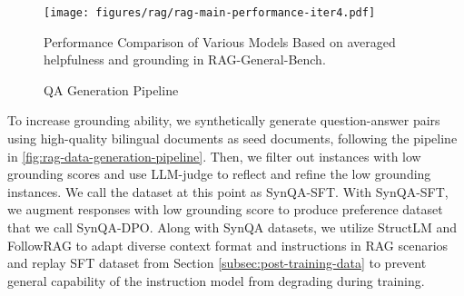 

\begin{figure}[h]
    \small
    \centering
    \texttt{[image: figures/rag/rag-main-performance-iter4.pdf]}
    \caption{Performance Comparison of Various Models Based on averaged helpfulness and grounding in RAG-General-Bench.}
    \label{fig:rag-main-performance}
\end{figure}

\begin{figure}[h]
\centering
{}
\caption{QA Generation Pipeline}
\label{fig:rag-data-generation-pipeline}
\end{figure}

To increase grounding ability, we synthetically generate question-answer pairs using high-quality bilingual documents as seed documents, following the pipeline in \autoref{fig:rag-data-generation-pipeline}.
Then, we filter out instances with low grounding scores and use LLM-judge to reflect and refine the low grounding instances.
We call the dataset at this point as SynQA-SFT. 
With SynQA-SFT, we augment responses with low grounding score to produce preference dataset that we call SynQA-DPO.
Along with SynQA datasets, we utilize StructLM \citep{zhuang2024structlmbuildinggeneralistmodels} and FollowRAG \citep{dong2024generalinstructionfollowingalignmentretrievalaugmented} to adapt diverse context format and instructions in RAG scenarios and replay SFT dataset from Section \ref{subsec:post-training-data} to prevent general capability of the instruction model from degrading during training.

